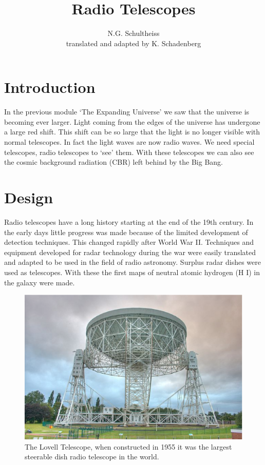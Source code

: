 \documentclass[12pt,a4paper]{article}
\author{N.G. Schultheiss \\ translated and adapted by K. Schadenberg}
\date{}
\title{Radio Telescopes}
\numberwithin{equation}{section}
\numberwithin{figure}{section}
\numberwithin{table}{section}
\begin{document}
\maketitle

\section{Introduction}
In the previous module `The Expanding Universe' we saw that the universe is becoming ever larger. Light coming from the edges of the universe has undergone a large red shift. This shift can be so large that the light is no longer visible with normal telescopes. In fact the light waves are now radio waves. We need special telescopes, radio telescopes to `see' them. With these telescopes we can also see the cosmic background radiation (CBR) left behind by the Big Bang. 

\section{Design}
Radio telescopes have a long history starting at the end of the 19th century. In the early days little progress was made because of the limited development of detection techniques. This changed rapidly after World War II. Techniques and equipment developed for radar technology during the war were easily translated and adapted to be used in the field of radio astronomy. Surplus radar dishes were used as telescopes. With these the first maps of neutral atomic hydrogen (H I) in the galaxy were made.

\begin{figure}\begin{center}
\includegraphics[scale=0.5]{Lovell_Telescope.eps}%
\caption{The Lovell Telescope, when constructed in 1955 it was the largest steerable dish radio telescope in the world.}
\end{center}\end{figure}
\end{document}
